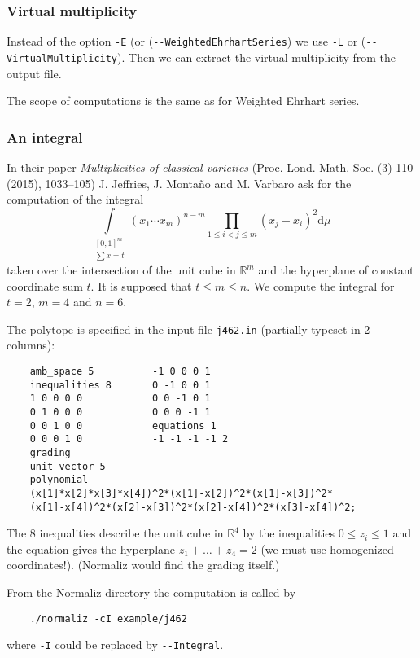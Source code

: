\documentclass[12pt,a4paper]{scrartcl}
\theoremstyle{definition}
\def\RR{{\mathbb R}}
\def\ttt{\texttt}
\begin{document}
{	
	\subsubsection{Virtual multiplicity}
	
	Instead of the option \verb|-E| (or (\verb|--WeightedEhrhartSeries|) we use \verb|-L| or (\verb|--VirtualMultiplicity|). Then we can extract the virtual multiplicity from the output file.
	
	The scope of computations is the same as for Weighted Ehrhart series.
	
	\subsubsection{An integral}
	In their paper \emph{Multiplicities of classical varieties} (Proc. Lond. Math. Soc. (3) 110 (2015), 1033--105) J. Jeffries, J. Monta\~no and M. Varbaro ask
	for the computation of the integral
	$$
	\int\limits_{\substack{[0,1]^m \\ \sum{x}= t}}(x_1\cdots x_{m})^{n-m}\prod_{1\le i<j \le m}(x_j-x_i)^2 \mathrm d{\mu}\
	$$
	taken over the intersection of the unit cube in $\RR^m$ and the hyperplane of constant coordinate sum $t$. It is supposed that $t\le m \le n$. We compute the integral for $t=2$, $m=4$ and $n=6$.
	
	The polytope is specified in the input file \ttt{j462.in} (partially typeset in 2
	columns):
	
	\begin{Verbatim}
	amb_space 5          -1 0 0 0 1   
	inequalities 8       0 -1 0 0 1   
	1 0 0 0 0            0 0 -1 0 1   
	0 1 0 0 0            0 0 0 -1 1   
	0 0 1 0 0            equations 1  
	0 0 0 1 0            -1 -1 -1 -1 2
	grading
	unit_vector 5
	polynomial
	(x[1]*x[2]*x[3]*x[4])^2*(x[1]-x[2])^2*(x[1]-x[3])^2*
	(x[1]-x[4])^2*(x[2]-x[3])^2*(x[2]-x[4])^2*(x[3]-x[4])^2;
	\end{Verbatim}
	
	The $8$ inequalities describe the unit cube in $\RR^4$ by the inequalities  $0\le z_i\le 1$
	and the equation gives the hyperplane $z_1+\dots+z_4=2$ (we must use homogenized coordinates!). (Normaliz would find the grading itself.)
	
	From the Normaliz directory the computation is called by
	
	\begin{Verbatim}
	./normaliz -cI example/j462
	\end{Verbatim}
	where \verb|-I| could be replaced by \verb|--Integral|.
	
}
\end{document}
